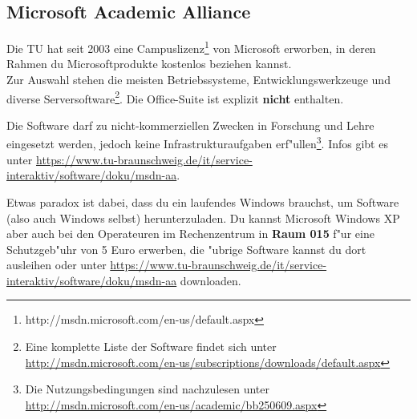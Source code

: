 \begin{multicols}{2}
\subsection{Microsoft Academic Alliance}
	\label{msdnaa}
	Die TU hat seit 2003 eine Campuslizenz\footnote{http://msdn.microsoft.com/en-us/default.aspx} von Microsoft erworben, in deren Rahmen du Microsoftprodukte kostenlos beziehen kannst.\\ 
	Zur Auswahl stehen die meisten Betriebssysteme, Entwicklungswerkzeuge und diverse Serversoftware\footnote{\sloppy Eine komplette Liste der Software findet sich unter \url{http://msdn.microsoft.com/en-us/subscriptions/downloads/default.aspx}}. Die Office-Suite ist explizit \textbf{nicht} enthalten.

	Die Software darf zu nicht-kommerziellen Zwecken in Forschung und Lehre eingesetzt werden, jedoch keine Infrastrukturaufgaben erf"ullen\footnote{Die Nutzungsbedingungen sind nachzulesen unter \url{http://msdn.microsoft.com/en-us/academic/bb250609.aspx}}. Infos gibt es unter \url{https://www.tu-braunschweig.de/it/service-interaktiv/software/doku/msdn-aa}.

	Etwas paradox ist dabei, dass du ein laufendes Windows brauchst, um Software (also auch Windows selbst) herunterzuladen. Du kannst Microsoft Windows XP aber auch bei den Operateuren im Rechenzentrum in \textbf{Raum 015} f"ur eine Schutzgeb"uhr von 5 Euro erwerben, die "ubrige Software kannst du dort ausleihen oder unter \url{https://www.tu-braunschweig.de/it/service-interaktiv/software/doku/msdn-aa} downloaden.
\end{multicols}